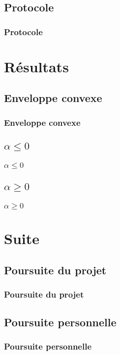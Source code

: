 \documentclass{beamer}
\begin{document}
\subsection{Protocole}
\begin{frame}
\frametitle{Protocole}
\end{frame}

\section{Résultats}

\subsection{Enveloppe convexe}
\begin{frame}
\frametitle{Enveloppe convexe}
\end{frame}

\subsection{$\alpha \leq 0$}
\begin{frame}
\frametitle{$\alpha \leq 0$}
\end{frame}

\subsection{$\alpha \geq 0$}
\begin{frame}
\frametitle{$\alpha \geq 0$}
\end{frame}

\section{Suite}

\subsection{Poursuite du projet}
\begin{frame}
\frametitle{Poursuite du projet}
\end{frame}

\subsection{Poursuite personnelle}
\begin{frame}
\frametitle{Poursuite personnelle}
\end{frame}

\end{document}
